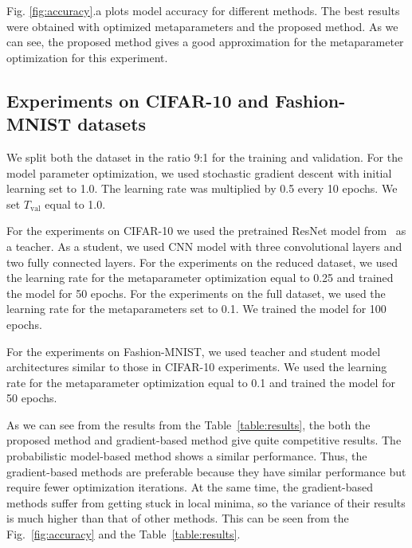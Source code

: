 \documentclass[runningheads]{llncs}
\begin{document}
Fig. \ref{fig:accuracy}.a plots model accuracy for different methods. The best results were obtained with optimized metaparameters and the proposed method. As we can see, the proposed method gives a good approximation for the metaparameter optimization for this experiment.



\subsection{Experiments on CIFAR-10 and Fashion-MNIST datasets}
We split both the dataset in the ratio 9:1 for the training and validation.  For the model parameter optimization, we used stochastic gradient descent with initial learning set to 1.0. The learning rate was multiplied by 0.5 every 10 epochs. We set  $T_\text{val}$ equal to 1.0.

For the experiments on CIFAR-10 we used the pretrained ResNet model from~\cite{pkt_eccv} as a teacher. As a student, we used CNN model with three convolutional layers and two fully connected layers. 
For the experiments on the reduced dataset, we used the learning rate for the metaparameter optimization equal to 0.25 and trained the model for 50 epochs. For  the experiments on the full dataset, we used  the learning rate for the metaparameters set to 0.1. We trained the model for 100 epochs. 

For the experiments on Fashion-MNIST, we used teacher and student model architectures similar to those in CIFAR-10 experiments. We used the learning rate for the metaparameter optimization equal to 0.1 and trained the model for 50 epochs.

As we can see from the results from the Table~\ref{table:results}, the both the proposed method and gradient-based method give quite competitive results. The probabilistic model-based method shows a similar performance. Thus, the gradient-based methods are preferable because they have similar performance but require fewer optimization iterations. At the same time, the gradient-based methods suffer from getting stuck in local minima, so the variance of their results is much higher than that of other methods. This can be seen from the Fig.~\ref{fig:accuracy} and the Table~\ref{table:results}.
\end{document}
